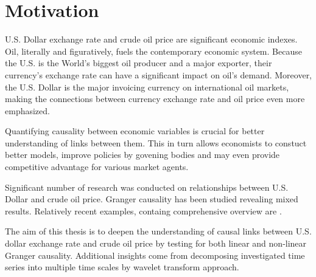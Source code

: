 \section{Motivation} \label{sec:motivation}

U.S. Dollar exchange rate and crude oil price are significant economic indexes.
Oil, literally and figuratively, fuels the contemporary economic system.
Because the U.S. is the World's biggest oil producer and a major exporter, their currency's exchange rate 
can have a significant impact on oil's demand. Moreover, the U.S. Dollar is the major invoicing currency
on international oil markets, making the connections between currency exchange rate and oil price even more
emphasized.

Quantifying causality between economic variables is crucial for better understanding of links between them.
This in turn allows economists to constuct better models, improve policies by govening bodies and may even 
provide competitive advantage for various market agents.

Significant number of research was conducted on relationships between U.S. Dollar and crude oil price.
Granger causality has been studied revealing mixed results. Relatively recent examples, containg comprehensive
overview are \cite{2010-oil-dollar, 2012-benhmad, 2017-oil-dollar}.

The aim of this thesis is to deepen the understanding of causal links between U.S. dollar exchange rate
and crude oil price by testing for both linear and non-linear Granger causality.
Additional insights come from decomposing investigated time series into multiple time scales by wavelet
transform approach.
